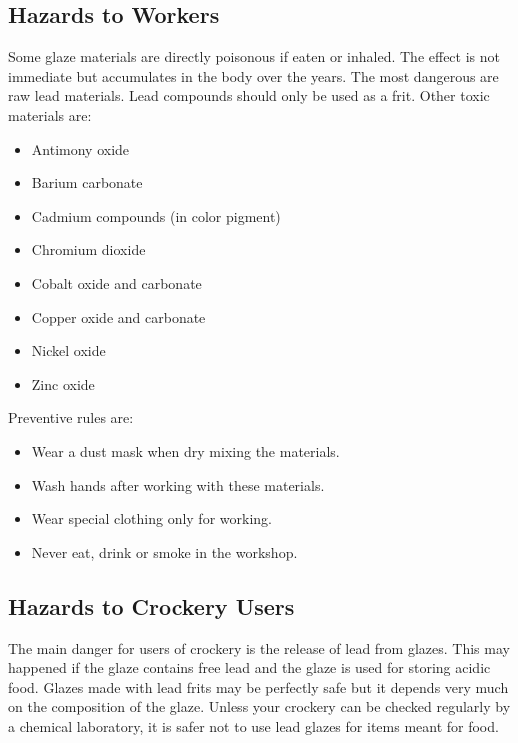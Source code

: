 \subsection{Hazards to Workers}
Some glaze materials are directly poisonous if eaten or inhaled. The effect is 
not immediate but accumulates in the body over the years. The most dangerous 
are raw lead materials. Lead compounds should only be used as a frit. Other 
toxic materials are:
\begin{itemize}
\item Antimony oxide
\item Barium carbonate
\item Cadmium compounds (in color pigment)
\item Chromium dioxide
\item Cobalt oxide and carbonate
\item Copper oxide and carbonate
\item Nickel oxide
\item Zinc oxide
\end{itemize}
Preventive rules are:
\begin{itemize}
\item Wear a dust mask when dry mixing the materials.
\item Wash hands after working with these materials.
\item Wear special clothing only for working.
\item Never eat, drink or smoke in the workshop.
\end{itemize}
\subsection{Hazards to Crockery Users}
The main danger for users of crockery is the release of lead from glazes. This 
may happened if the glaze contains free lead and the glaze is used for storing 
acidic food. Glazes made with lead frits may be perfectly safe but it depends 
very much on the composition of the glaze. Unless your crockery can be checked 
regularly by a chemical laboratory, it is safer not to use lead glazes for 
items meant for food.
